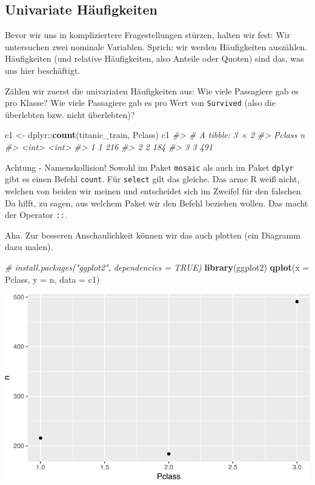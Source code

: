 \documentclass[12pt,ngerman,]{book}
\newenvironment{Shaded}{\begin{snugshade}}{\end{snugshade}}
\newcommand{\KeywordTok}[1]{\textcolor[rgb]{0.13,0.29,0.53}{\textbf{{#1}}}}
\newcommand{\DataTypeTok}[1]{\textcolor[rgb]{0.13,0.29,0.53}{{#1}}}
\newcommand{\StringTok}[1]{\textcolor[rgb]{0.31,0.60,0.02}{{#1}}}
\newcommand{\CommentTok}[1]{\textcolor[rgb]{0.56,0.35,0.01}{\textit{{#1}}}}
\newcommand{\NormalTok}[1]{{#1}}
\renewenvironment{Shaded}{\begin{kframe}}{\end{kframe}}
\let\BeginKnitrBlock\begin \let\EndKnitrBlock\end
\begin{document}
\subsection{Univariate Häufigkeiten}\label{univariate-haufigkeiten}

Bevor wir uns in kompliziertere Fragestellungen stürzen, halten wir
fest: Wir untersuchen zwei nominale Variablen. Sprich: wir werden
Häufigkeiten auszählen. Häufigkeiten (und relative Häufigkeiten, also
Anteile oder Quoten) sind das, was uns hier beschäftigt.

Zählen wir zuerst die univariaten Häufigkeiten aus: Wie viele Passagiere
gab es pro Klasse? Wie viele Passagiere gab es pro Wert von
\texttt{Survived} (also die überlebten bzw. nicht überlebten)?

\begin{Shaded}
\begin{Highlighting}[]
\NormalTok{c1 <-}\StringTok{ }\NormalTok{dplyr::}\KeywordTok{count}\NormalTok{(titanic_train, Pclass)}
\NormalTok{c1}
\CommentTok{#> # A tibble: 3 × 2}
\CommentTok{#>   Pclass     n}
\CommentTok{#>    <int> <int>}
\CommentTok{#> 1      1   216}
\CommentTok{#> 2      2   184}
\CommentTok{#> 3      3   491}
\end{Highlighting}
\end{Shaded}

\BeginKnitrBlock{rmdcaution}
Achtung - Namenskollision! Sowohl im Paket \texttt{mosaic} als auch im
Paket \texttt{dplyr} gibt es einen Befehl \texttt{count}. Für
\texttt{select} gilt das gleiche. Das arme R weiß nicht, welchen von
beiden wir meinen und entscheidet sich im Zweifel für den falschen. Da
hilft, zu sagen, aus welchem Paket wir den Befehl beziehen wollen. Das
macht der Operator \texttt{::}.
\EndKnitrBlock{rmdcaution}

Aha. Zur besseren Anschaulichkeit können wir das auch plotten (ein
Diagramm dazu malen).

\begin{Shaded}
\begin{Highlighting}[]
\CommentTok{# install.packages("ggplot2", dependencies = TRUE)}
\KeywordTok{library}\NormalTok{(ggplot2)}
\KeywordTok{qplot}\NormalTok{(}\DataTypeTok{x =} \NormalTok{Pclass, }\DataTypeTok{y =} \NormalTok{n, }\DataTypeTok{data =} \NormalTok{c1)}
\end{Highlighting}
\end{Shaded}

\begin{center}\includegraphics[width=0.7\linewidth]{075_Fallstudie_Titanic_files/figure-latex/plot-titanic1-1} \end{center}
\end{document}
